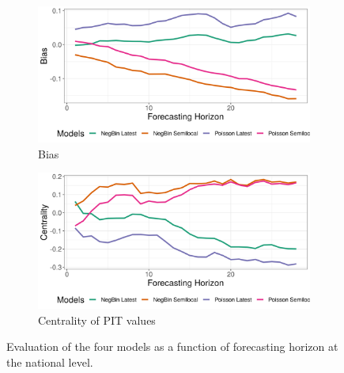 \documentclass[12pt]{article}
\begin{document}
\begin{figure}[h!]
\begin{subfigure}{0.5\textwidth}
  \centering
  \includegraphics[width=\linewidth]{../output/national_bias.png}  
  \caption{Bias}
  \label{fig:sub-third}
\end{subfigure}
\begin{subfigure}{0.5\textwidth}
  \centering
  \includegraphics[width=\linewidth]{../output/national_centrality.png}  
  \caption{Centrality of PIT values}
  \label{fig:nat_scores_4}
\end{subfigure}
  \caption{Evaluation of the four models as a function of forecasting horizon at the national level.}

  \label{fig:nat_scores}
\end{figure}
\end{document}
